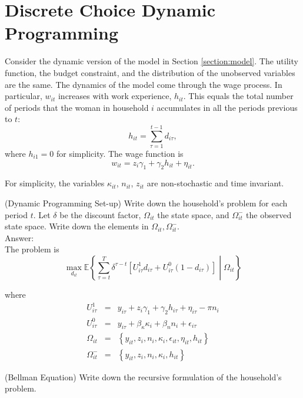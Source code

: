 \section{Discrete Choice Dynamic Programming}
Consider the dynamic version of the model in Section \ref{section:model}. The utility function, the budget constraint, and the distribution of the unobserved variables are the same. The dynamics of the model come through the wage process. In particular, $w_{it}$ increases with work experience, $h_{it}$. This equals the total number of periods that the woman in household $i$ accumulates in all the periods previous to $t$:
\begin{equation}
h_{it} = \sum\limits_{\tau=1}^{t-1} d_{i\tau},
\end{equation} 
\noindent where $h_{i1} = 0$ for simplicity. The wage function is
\begin{equation}
w_{it} = z_{i}\gamma_{1} + \gamma_{2}h_{it} + \eta_{it}.
\end{equation} 

\noindent For simplicity, the variables $\kappa_{it}$, $n_{it}$, $z_{it}$ are non-stochastic and time invariant.

\begin{exercise} (Dynamic Programming Set-up)
Write down the household's problem for each period $t$. Let $\delta$ be the discount factor, $\Omega_{it}$ the state space, and $\Omega_{it}^-$ the observed state space. Write down the elements in $\Omega_{it},\Omega_{it}^-$.\\
\noindent Answer:\\	
\noindent The problem is
\begin{equation}
\max_{d_{it}} \mathbb{E}\left\{ \sum\limits_{\tau=t}^{T}\delta^{\tau-t} \left[U^{1}_{i\tau}d_{i\tau} + U^{0}_{i\tau}\left( 1-d_{i\tau} \right)\right] \middle| \Omega_{it}\right\} 
\end{equation}

\noindent where
\begin{eqnarray}
U^{1}_{i\tau} &=& y_{i\tau} + z_{i}\gamma_{1} + \gamma_{2}h_{i\tau} + \eta_{i\tau} - \pi n_{i}\\
U^{0}_{i\tau} &=& y_{i\tau} + \beta_{\kappa}\kappa_{i} + \beta_{n}n_{i} + \epsilon_{i\tau}\\
\Omega_{it} &=& \left\{ y_{it}, z_{i}, n_{i}, \kappa_{i}, \epsilon_{it}, \eta_{it}, h_{it}\right\}\\
\Omega_{it}^- &=& \left\{ y_{it}, z_{i}, n_{i}, \kappa_{i}, h_{it}\right\}
\end{eqnarray}
\end{exercise}
\begin{exercise} (Bellman Equation)
Write down the recursive formulation of the household's problem.
\end{exercise}

